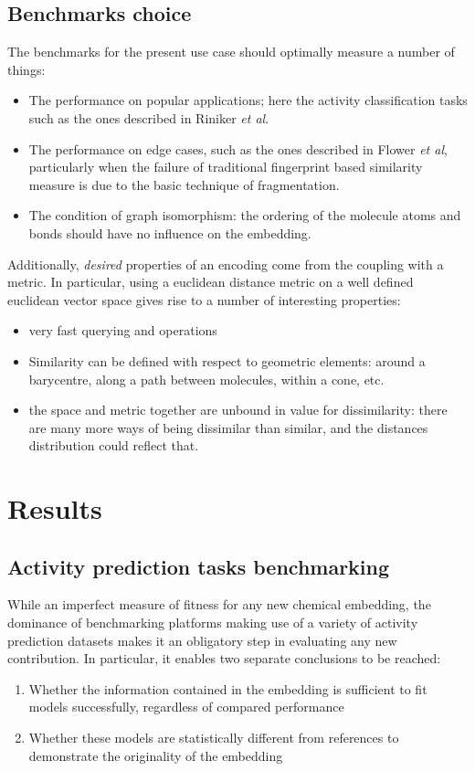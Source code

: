 \documentclass[journal=jacsat,manuscript=article]{achemso}
\begin{document}
\subsection{Benchmarks choice}
The benchmarks for the present use case should optimally measure a number of things:
\begin{itemize}
\item The performance on popular applications; here the activity classification tasks such as the ones described in Riniker \textit{et al}\cite{riniker2013open}.
\item The performance on edge cases, such as the ones described in Flower \textit{et al}\cite{flower1998properties}, particularly when the failure of traditional fingerprint based similarity measure is due to the basic technique of fragmentation.
\item The condition of graph isomorphism: the ordering of the molecule atoms and bonds should have no influence on the embedding.
\end{itemize}
Additionally, \textit{desired} properties of an encoding come from the coupling with a metric. In particular, using a euclidean distance metric on a well defined euclidean vector space gives rise to a number of interesting properties:
\begin{itemize}
\item very fast querying and operations
\item Similarity can be defined with respect to geometric elements: around a barycentre, along a path between molecules, within a cone, etc.
\item the space and metric together are unbound in value for dissimilarity: there are many more ways of being dissimilar than similar, and the distances distribution could reflect that.
\end{itemize}
\section{Results}\label{results}
\subsection{Activity prediction tasks benchmarking}
While an imperfect measure of fitness for any new chemical embedding, the dominance of benchmarking platforms making use of a variety of activity prediction datasets makes it an obligatory step in evaluating any new contribution. In particular, it enables two separate conclusions to be reached:
\begin{enumerate}
\item Whether the information contained in the embedding is sufficient to fit models successfully, regardless of compared performance
\item Whether these models are statistically different from references to demonstrate the originality of the embedding
\end{enumerate}
\end{document}
